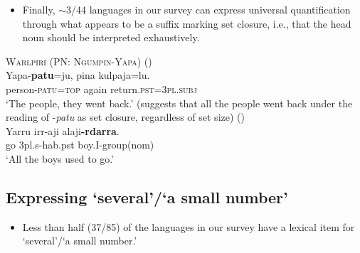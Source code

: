 \documentclass{article}
\makeatletter
\newcommand{\ofy}{/85} %
\makeatother
\begin{document}
\begin{itemize}
    \item Finally, $\sim$3/44 languages in our survey can express universal quantification through what appears to be a suffix marking set closure, i.e., that the head noun should be interpreted exhaustively. 
\end{itemize}

\begin{exe}
\ex \textsc{Warlpiri (PN: Ngumpin-Yapa)} (\citealt[13--14]{bowler17})\\
\gll Yapa-\textbf{patu}=ju, pina kulpaja=lu.\\
person-\textsc{patu}=\textsc{top} again return.\textsc{pst}=\textsc{3pl.subj}\\
\glt `The people, they went back.' (suggests that all the people went back under the reading of -\textit{patu} as set closure, regardless of set size)
 (\citealt[80]{nordlinger98})\\
 \gll Yarru irr-aji  alaji\textbf{-rdarra}.\\
go  3{\sc pl.s-hab.pst} boy.I-{\sc group(nom)}\\
\glt `All the boys used to go.' 
\end{exe}


\subsection{Expressing `several'/`a small number'}

\begin{itemize}
    \item Less than half (37\ofy) of the languages in our survey have a lexical item for `several'/`a small number.'
\end{itemize}
\end{document}
